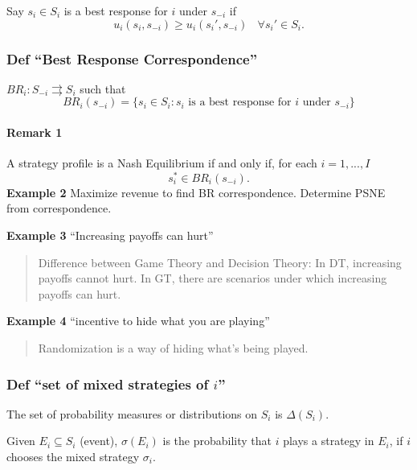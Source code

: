 \documentclass[
]{article}
\begin{document}
Say \(s_i \in S_i\) is a best response for \(i\) under \(s_{-i}\) if
\[u_i(s_i, s_{-i}) \geq u_i(s_i', s_{-i})~~~~ \forall s_i' \in S_i.\]

\hypertarget{def-best-response-correspondence}{%
\subsubsection{Def ``Best Response
Correspondence''}\label{def-best-response-correspondence}}

\(BR_i: S_{-i} \rightrightarrows S_i\) such that
\[BR_i(s_{-i}) = \{s_i \in S_i: s_i \text{ is a best response for } i \text{ under } s_{-i}\}\]

\hypertarget{remark-1}{%
\paragraph{Remark 1}\label{remark-1}}

A strategy profile is a Nash Equilibrium if and only if, for each
\(i = 1, ..., I\) \[s_i^* \in BR_i(s_{-i}).\] \textbf{Example 2}
Maximize revenue to find BR correspondence. Determine PSNE from
correspondence.

\textbf{Example 3} ``Increasing payoffs can hurt''

\begin{quote}
Difference between Game Theory and Decision Theory: In DT, increasing
payoffs cannot hurt. In GT, there are scenarios under which increasing
payoffs can hurt.
\end{quote}

\textbf{Example 4} ``incentive to hide what you are playing''

\begin{quote}
Randomization is a way of hiding what's being played.
\end{quote}

\hypertarget{def-set-of-mixed-strategies-of-i}{%
\subsubsection{\texorpdfstring{Def ``set of mixed strategies of
\(i\)''}{Def ``set of mixed strategies of i''}}\label{def-set-of-mixed-strategies-of-i}}

The set of probability measures or distributions on \(S_i\) is
\(\Delta(S_i).\)

Given \(E_i \subseteq S_i\) (event), \(\sigma(E_i)\) is the probability
that \(i\) plays a strategy in \(E_i\), if \(i\) chooses the mixed
strategy \(\sigma_i\).
\end{document}
